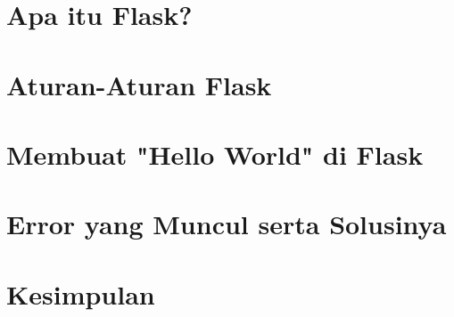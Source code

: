 \documentclass[12pt]{article}
\begin{document}
\section{Apa itu Flask?}


\section{Aturan-Aturan Flask}

 
\section{Membuat "Hello World" di Flask}


\section{Error yang Muncul serta Solusinya}


\section{Kesimpulan}

	
\end{document}
